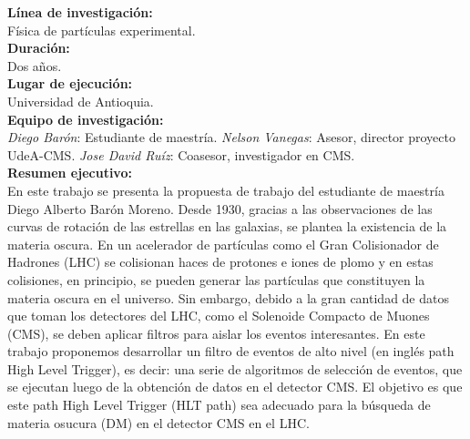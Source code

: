 \textbf{Línea de investigación:}\\
Física de partículas experimental.
\\

\textbf{Duración:}\\
Dos años.
\\

\textbf{Lugar de ejecución:}\\
Universidad de Antioquia.
\\

\textbf{Equipo de investigación:}\\
\emph{Diego Barón}: Estudiante de maestría.
\emph{Nelson Vanegas}: Asesor, director proyecto UdeA-CMS.
\emph{Jose David Ruíz}: Coasesor, investigador en CMS.
\\

\textbf{Resumen ejecutivo:}\\
En este trabajo se presenta la propuesta de trabajo del estudiante de maestría Diego Alberto Barón Moreno. Desde 1930, gracias a las observaciones de las curvas de rotación de las estrellas en las galaxias, se plantea la existencia de la materia oscura. En un acelerador de partículas como el Gran Colisionador de Hadrones (LHC) se colisionan haces de protones e iones de plomo y en estas colisiones, en principio, se pueden generar las partículas que constituyen la materia oscura en el universo. Sin embargo, debido a la gran cantidad de datos que toman los detectores del LHC, como el Solenoide Compacto de Muones (CMS), se deben aplicar filtros para aislar los eventos interesantes. En este trabajo proponemos desarrollar un filtro de eventos de alto nivel (en inglés path High Level Trigger), es decir: una serie de algoritmos de selección de eventos, que se ejecutan luego de la obtención de datos en el detector CMS. El objetivo es que este path High Level Trigger (HLT path) sea adecuado para la búsqueda de materia osucura (DM) en el detector CMS en el LHC.


\newpage























